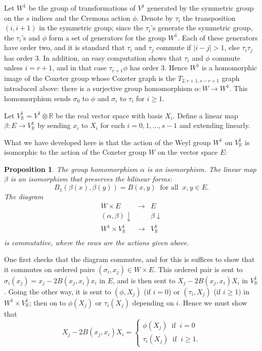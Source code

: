 \documentclass[12pt]{article}
\numberwithin{equation}{section}
\newtheorem{proposition}[equation]{Proposition}
\numberwithin{equation}{section}
\numberwithin{subeq}{equation}
\def\bbR{\mathbb{R}}
\begin{document}
Let $W^1$ be the group of transformations of $V^1$
generated by the symmetric group on the $s$ indices
and the Cremona action $\phi$.
Denote by $\tau_i$ the transposition $(i,i+1)$ in the symmetric group;
since the $\tau_i$'s generate the symmetric group,
the $\tau_i$'s and $\phi$ form a set of generators for the group $W^1$.
Each of these generators have order two,
and it is standard that
$\tau_i$ and $\tau_j$ commute if $|i-j| > 1$, else $\tau_i\tau_j$ has order $3$.
In addition, an easy computation shows that
$\tau_i$ and $\phi$ commute unless $i = r+1$, and in that case $\tau_{r+1}\phi$ has order $3$.
Hence $W^1$ is a homomorphic image of the Coxeter group
whose Coxeter graph is the $T_{2, r+1, s-r+1}$ graph introduced above:
there is a surjective group homomorphism $\alpha:W \to W^1$.
This homomorphism sends $\sigma_0$ to $\phi$ and $\sigma_i$ to $\tau_i$ for $i \geq 1$.

Let $V^1_{\bbR} = V^1 \otimes \bbR$ be the real vector space with basis $X_i$.
Define a linear map $\beta: E \to V^1_\bbR$ by sending $x_i$ to $X_i$ for each $i = 0,1,\ldots,s-1$
and extending linearly.

What we have developed here is that the action of the Weyl group $W^1$ on $V^1_\bbR$
is isomorphic to the action of the Coxeter group $W$ on the vector space $E$:

\begin{proposition}\label{actionW1V1}
The group homomorphism $\alpha$ is an isomorphism.
The linear map $\beta$ is an isomorphism that preserves the bilinear forms:
\[
B_1(\beta(x),\beta(y)) = B(x,y) \;\;\text{for all}\;\; x, y \in E.
\]
The diagram
\[
\begin{matrix}%
W \times E & \longrightarrow & E \\
(\alpha,\beta) \downarrow & & \beta \downarrow \\
W^1 \times V^1_\bbR & \longrightarrow & V^1_\bbR \\
\end{matrix}
\]
is commutative, where the rows are the actions given above.
\end{proposition}

\medskip{}
One first checks that the diagram commutes,
and for this is suffices to show that it commutes on ordered pairs
$(\sigma_i,x_j) \in W \times E$.
This ordered pair is sent to $\sigma_i(x_j) = x_j - 2B(x_j,x_i)x_i$ in $E$,
and is then sent to $X_j - 2B(x_j,x_i)X_i$ in $V^1_\bbR$.
Going the other way, it is sent to
$(\phi,X_j)$ (if $i=0$) or $(\tau_i,X_j)$ (if $i \geq 1)$ in $W^1\times V^1_\bbR$;
then on to $\phi(X_j)$ or $\tau_i(X_j)$ depending on $i$.
Hence we must show that
\[
X_j - 2B(x_j,x_i)X_i = 
\begin{cases}
\phi(X_j) \;\;\text{if}\;\; i = 0\\
\tau_i(X_j) \;\;\text{if}\;\; i \geq 1.
\end{cases}
\]
\end{document}
